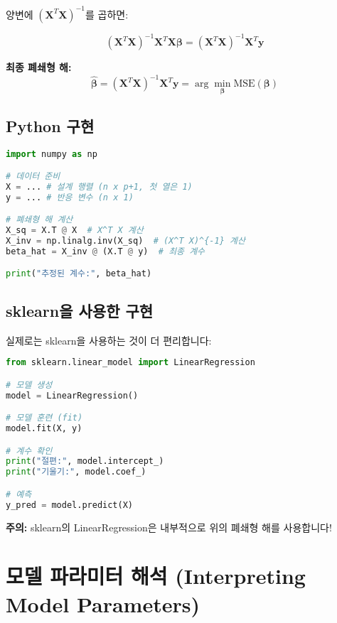 \documentclass[12pt]{article}
\begin{document}
양변에 $(\mathbf{X}^T\mathbf{X})^{-1}$를 곱하면:

\begin{equation}
(\mathbf{X}^T\mathbf{X})^{-1}\mathbf{X}^T\mathbf{X}\boldsymbol{\beta} = (\mathbf{X}^T\mathbf{X})^{-1}\mathbf{X}^T\mathbf{y}
\end{equation}

\textbf{최종 폐쇄형 해:}
\begin{equation}
\boxed{\hat{\boldsymbol{\beta}} = (\mathbf{X}^T\mathbf{X})^{-1}\mathbf{X}^T\mathbf{y} = \arg\min_{\boldsymbol{\beta}} \text{MSE}(\boldsymbol{\beta})}
\end{equation}

\subsection{Python 구현}

\begin{lstlisting}[language=Python]
import numpy as np

# 데이터 준비
X = ... # 설계 행렬 (n x p+1, 첫 열은 1)
y = ... # 반응 변수 (n x 1)

# 폐쇄형 해 계산
X_sq = X.T @ X  # X^T X 계산
X_inv = np.linalg.inv(X_sq)  # (X^T X)^{-1} 계산
beta_hat = X_inv @ (X.T @ y)  # 최종 계수

print("추정된 계수:", beta_hat)
\end{lstlisting}

\subsection{sklearn을 사용한 구현}

실제로는 sklearn을 사용하는 것이 더 편리합니다:

\begin{lstlisting}[language=Python]
from sklearn.linear_model import LinearRegression

# 모델 생성
model = LinearRegression()

# 모델 훈련 (fit)
model.fit(X, y)

# 계수 확인
print("절편:", model.intercept_)
print("기울기:", model.coef_)

# 예측
y_pred = model.predict(X)
\end{lstlisting}

\textbf{주의:} sklearn의 LinearRegression은 내부적으로 위의 폐쇄형 해를 사용합니다!

\section{모델 파라미터 해석 (Interpreting Model Parameters)}
\end{document}
